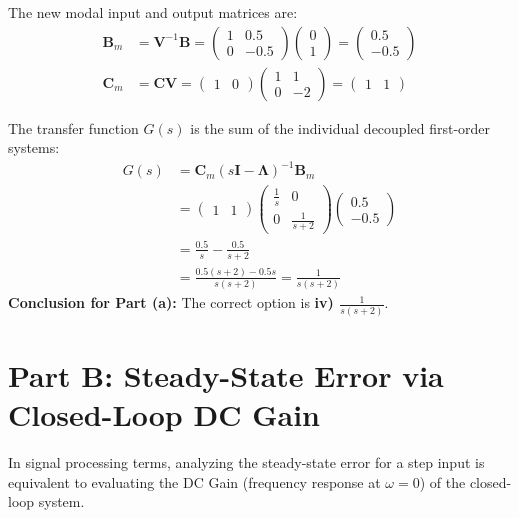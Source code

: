 \documentclass[journal,12pt,onecolumn]{IEEEtran}
\theoremstyle{remark}
\begin{document}
The new modal input and output matrices are:
\begin{align*}
\mathbf{B}_m &= \mathbf{V}^{-1}\mathbf{B} = \begin{pmatrix} 1 & 0.5 \\ 0 & -0.5 \end{pmatrix} \begin{pmatrix} 0 \\ 1 \end{pmatrix} = \begin{pmatrix} 0.5 \\ -0.5 \end{pmatrix} \\
\mathbf{C}_m &= \mathbf{C}\mathbf{V} = \begin{pmatrix} 1 & 0 \end{pmatrix} \begin{pmatrix} 1 & 1 \\ 0 & -2 \end{pmatrix} = \begin{pmatrix} 1 & 1 \end{pmatrix}
\end{align*}

The transfer function $G(s)$ is the sum of the individual decoupled first-order systems:
\begin{align*}
G(s) &= \mathbf{C}_m(s\mathbf{I} - \mathbf{\Lambda})^{-1}\mathbf{B}_m \\
&= \begin{pmatrix} 1 & 1 \end{pmatrix} \begin{pmatrix} \frac{1}{s} & 0 \\ 0 & \frac{1}{s+2} \end{pmatrix} \begin{pmatrix} 0.5 \\ -0.5 \end{pmatrix} \\
&= \frac{0.5}{s} - \frac{0.5}{s+2} \\
&= \frac{0.5(s+2) - 0.5s}{s(s+2)} = \frac{1}{s(s+2)}
\end{align*}
\textbf{Conclusion for Part (a):} The correct option is \textbf{iv) $\frac{1}{s(s+2)}$}.


\section{Part B: Steady-State Error via Closed-Loop DC Gain}

In signal processing terms, analyzing the steady-state error for a step input is equivalent to evaluating the DC Gain (frequency response at $\omega = 0$) of the closed-loop system.
\end{document}

